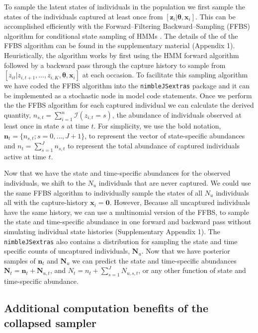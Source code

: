 \documentclass[11pt]{article}
\newcommand{\bx}{\ensuremath{\mathbf{x}}}
\newcommand{\bn}{\ensuremath{\mathbf{n}}}
\newcommand{\bz}{\ensuremath{\mathbf{z}}}
\newcommand{\bN}{\ensuremath{\mathbf{N}}}
\newcommand{\bt}{\ensuremath{\boldsymbol{\theta}}}
\begin{document}
To sample the latent states of individuals in the population we first sample the states of the individuals captured at least once from $[\bz_i| \bt, \bx_i]$. This can be accomplished efficiently with the Forward--Filtering Backward--Sampling (FFBS) algorithm for conditional state sampling of HMMs \citep{scott2002bayesian}. The details of the of the FFBS algorithm can be found in the supplementary material (Appendix 1). Heuristically, the algorithm works by first using the HMM forward algorithm \citep{zucchini2016hidden} followed by a backward pass through the capture history to sample from $[z_{it}|z_{i,t+1},\dots,z_{i,K},\bt, \bx_i]$ at each occasion. To facilitate this sampling algorithm we have coded the FFBS algorithm into the {\tt nimbleJSextras} package and it can be implemented as a stochastic node in model code statements. Once we perform the the FFBS algorithm for each captured individual we can calculate the derived quantity, $n_{s,t} = \sum_{i=1}^n \mathcal{I}(z_{i,t}=s)$, the abundance of individuals observed at least once in state $s$ at time $t$. For simplicity, we use the bold notation, $\bn_t = \{n_{s,t};s=0,\dots,J+1\}$, to represent the vector of state-specific abundances and $n_t = \sum_{s=1}^{J} n_{s,t}$ to represent the total abundance of captured individuals active at time $t$. 

Now that we have the state and time-specific abundances for the observed individuals, we shift to the $N_u$ individuals that are never captured. We could use the same FFBS algorithm to individually sample the states of all $N_u$ individuals all with the capture-history $\bx_i=\mathbf{0}$. However, Because all uncaptured individuals have the same history, we can use a multinomial version of the FFBS, to sample the state and time-specific abundance in one forward and backward pass without simulating individual state histories (Supplementary Appendix 1). The {\tt nimbleJSextras} also contains a distribution for sampling the state and time specific counts of uncaptured individuals, $\mathbf{N}_u$. 
Now that we have posterior samples of $\bn_t$ and $\bN_{u}$ we can predict the state and time-specific abundances $\bN_t =  \bn_t + \bN_{u,t}$, and $N_t =  n_t + \sum_{s=1}^J N_{u,s,t}$, or any other function of state and time-specific abundance.   

\subsection{Additional computation benefits of the collapsed sampler} \label{sec.savings}
\end{document}

